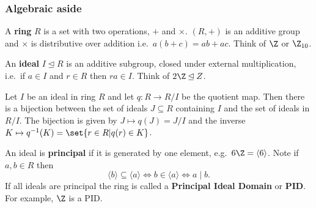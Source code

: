 \documentclass{article}
\newcommand{\1}[1]{\mathbbm{1}_{#1}}
\begin{document}
\subsubsection*{Algebraic aside}
A \textbf{ring} $R$ is a set with two operations, $+$ and $\times$. $(R, +)$ is an additive group and $\times$ is distributive over addition i.e.\ $a(b+c)=ab+ac$. Think of $\Z$ or $\Z_{10}$.

An \textbf{ideal} $I \unlhd R$ is an additive subgroup, closed under external multiplication, i.e.\ if $a \in I$ and $r \in R$ then $ra \in I$. Think of $2\Z \unlhd Z$.
\begin{nlemma}\label{lem:2.27}
    Let $I$ be an ideal in ring $R$ and let $q: R \to R/I$ be the quotient map.
    Then there is a bijection between the set of ideals $J \subseteq R$ containing $I$ and the set of ideals in $R/I$.
    The bijection is given by $J \mapsto q(J) = J/I$ and the inverse $K \mapsto q^{-1}(K) = \set{r \in R | q(r) \in K}$.
\end{nlemma}
An ideal is \textbf{principal} if it is generated by one element, e.g.\ $6\Z = \langle6 \rangle$.
Note if $a,b\in R$ then
\begin{equation*}
    \langle b \rangle \subseteq \langle a \rangle \iff b \in \langle a \rangle \iff a \mid b.
\end{equation*}
If all ideals are principal the ring is called a \textbf{Principal Ideal Domain} or \textbf{PID}.
For example, $\Z$ is a PID.
\end{document}
